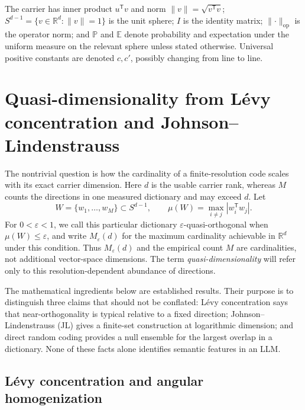 \documentclass[
  aps,
  reprint,
  superscriptaddress,
  floatfix,
  nofootinbib,
  longbibliography
]{revtex4-2}
\newcommand{\R}{\mathbb{R}}
\newcommand{\E}{\mathbb{E}}
\newcommand{\Prob}{\mathbb{P}}
\newcommand{\Sph}[1]{S^{#1}}
\newcommand{\Msem}{M}
\newcommand{\T}{^{\mathsf{T}}}
\newcommand{\opnorm}[1]{\lVert #1 \rVert_{\mathrm{op}}}
\newcommand{\norm}[1]{\lVert #1 \rVert}
\begin{document}
The carrier has inner product $u\T v$
and norm $\norm{v}=\sqrt{v\T v}$; $\Sph{d-1}=\{v\in\R^{d}:\norm{v}=1\}$
is the unit sphere; $I$ is the identity matrix; $\opnorm{\cdot}$ is the
operator norm; and $\Prob$ and $\E$ denote probability and expectation under the uniform measure on
the relevant sphere unless stated otherwise. Universal positive
constants are denoted $c,c'$, possibly changing from line to line.

\section{Quasi-dimensionality from L\'evy concentration and
Johnson--Lindenstrauss}
\label{sec:concentration}

The nontrivial question is how the cardinality of a finite-resolution code
scales with its exact carrier dimension.  Here $d$ is the usable carrier rank,
whereas $\Msem$ counts the directions in one measured
dictionary and may exceed $d$.  Let
\begin{equation}
\label{eq:quasiortho}
W=\{w_1,\ldots,w_{\Msem}\}\subset\Sph{d-1},
\qquad
\mu(W)=\max_{i\ne j}|w_i\T w_j|.
\end{equation}
For $0<\varepsilon<1$, we call this particular dictionary
$\varepsilon$-quasi-orthogonal when $\mu(W)\leq\varepsilon$, and write
$M_\varepsilon(d)$ for the maximum cardinality achievable in $\R^d$ under
this condition.  Thus
$M_\varepsilon(d)$ and the empirical count $\Msem$ are cardinalities, not
additional vector-space dimensions.  The term \emph{quasi-dimensionality}
will refer only to this resolution-dependent abundance of directions.

The mathematical ingredients below are established results.  Their purpose
is to distinguish three claims that should not be conflated: L\'evy
concentration says that near-orthogonality is typical relative to a fixed
direction; Johnson--Lindenstrauss (JL) gives a finite-set construction at
logarithmic dimension; and direct random coding provides a null ensemble for
the largest overlap in a dictionary.  None of these facts alone identifies
semantic features in an LLM.

\subsection{L\'evy concentration and angular homogenization}
\label{sec:levy}
\end{document}
